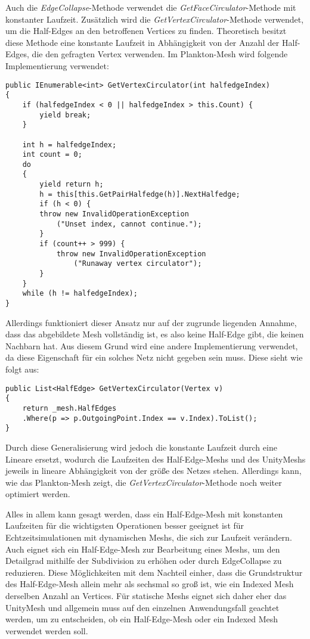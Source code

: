 Auch die \textit{EdgeCollapse}-Methode verwendet die \textit{GetFaceCirculator}-Methode mit konstanter Laufzeit. Zus\"atzlich wird die \textit{GetVertexCirculator}-Methode verwendet, um die Half-Edges an den betroffenen Vertices zu finden. Theoretisch besitzt diese Methode eine konstante Laufzeit in Abh\"angigkeit von der Anzahl der Half-Edges, die den gefragten Vertex verwenden. Im Plankton-Mesh \cite{Meshmash2017} wird folgende Implementierung verwendet:
\begin{lstlisting}
public IEnumerable<int> GetVertexCirculator(int halfedgeIndex)
{
	if (halfedgeIndex < 0 || halfedgeIndex > this.Count) { 
		yield break; 
	}
	
	int h = halfedgeIndex;
	int count = 0;
	do
	{
		yield return h;
		h = this[this.GetPairHalfedge(h)].NextHalfedge;
		if (h < 0) { 
		throw new InvalidOperationException
			("Unset index, cannot continue."); 
		}
		if (count++ > 999) {
			throw new InvalidOperationException
				("Runaway vertex circulator"); 
		}
	}
	while (h != halfedgeIndex);
}
\end{lstlisting}
Allerdings funktioniert dieser Ansatz nur auf der zugrunde liegenden Annahme, dass das abgebildete Mesh vollst\"andig ist, es also keine Half-Edge gibt, die keinen Nachbarn hat. Aus diesem Grund wird eine andere Implementierung verwendet, da diese Eigenschaft f\"ur ein solches Netz nicht gegeben sein muss. Diese sieht wie folgt aus: 
\begin{lstlisting}
public List<HalfEdge> GetVertexCirculator(Vertex v)
{
	return _mesh.HalfEdges
	.Where(p => p.OutgoingPoint.Index == v.Index).ToList();
}
\end{lstlisting}
Durch diese Generalisierung wird jedoch die konstante Laufzeit durch eine Lineare ersetzt, wodurch die Laufzeiten des Half-Edge-Meshs und des UnityMeshs jeweils in lineare Abh\"angigkeit von der gr\"o{\ss}e des Netzes stehen. Allerdings kann, wie das Plankton-Mesh zeigt, die \textit{GetVertexCirculator}-Methode noch weiter optimiert werden. 

Alles in allem kann gesagt werden, dass ein Half-Edge-Mesh mit konstanten Laufzeiten f\"ur die wichtigsten Operationen besser geeignet ist f\"ur Echtzeitsimulationen mit dynamischen Meshs, die sich zur Laufzeit ver\"andern. Auch eignet sich ein Half-Edge-Mesh zur Bearbeitung eines Meshs, um den Detailgrad mithilfe der Subdivision zu erh\"ohen oder durch EdgeCollapse zu reduzieren. Diese M\"oglichkeiten mit dem Nachteil einher, dass die Grundstruktur des Half-Edge-Mesh allein mehr als sechsmal so gro{\ss} ist, wie ein Indexed Mesh derselben Anzahl an Vertices. F\"ur statische Meshs eignet sich daher eher das UnityMesh und allgemein muss auf den einzelnen Anwendungsfall geachtet werden, um zu entscheiden, ob ein Half-Edge-Mesh oder ein Indexed Mesh verwendet werden soll.

